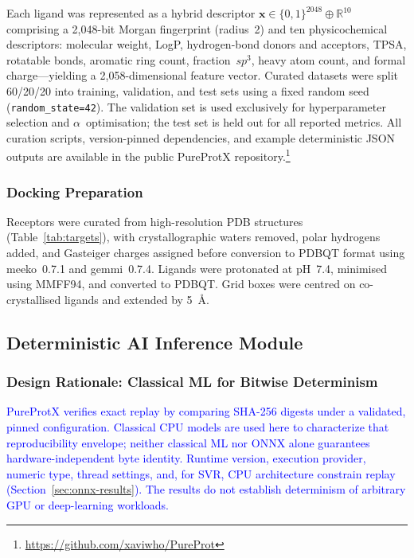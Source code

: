 \documentclass[conference]{IEEEtran}
\newcommand{\rev}[2]{\textcolor{blue}{#2}}
\begin{document}
Each ligand was represented as a hybrid descriptor
$\mathbf{x} \in \{0,1\}^{2048} \oplus \mathbb{R}^{10}$
comprising a 2{,}048-bit Morgan fingerprint (radius~2) and
ten physicochemical descriptors: molecular weight, LogP,
hydrogen-bond donors and acceptors, TPSA, rotatable bonds,
aromatic ring count, fraction~$sp^3$, heavy atom count, and
formal charge---yielding a 2{,}058-dimensional feature vector.
Curated datasets were split 60/20/20 into training, validation,
and test sets using a fixed random seed (\texttt{random\_state=42}).
The validation set is used exclusively for hyperparameter
selection and $\alpha$~optimisation; the test set is held out
for all reported metrics.
All curation scripts, version-pinned dependencies, and example
deterministic JSON outputs are available in the public
PureProtX repository.\footnote{\url{https://github.com/xaviwho/PureProt}}

\subsubsection{Docking Preparation}
Receptors were curated from high-resolution PDB structures
(Table~\ref{tab:targets}), with crystallographic waters removed,
polar hydrogens added, and Gasteiger charges assigned before
conversion to PDBQT format using meeko~0.7.1 and gemmi~0.7.4.
Ligands were protonated at pH~7.4, minimised using MMFF94, and
converted to PDBQT.
Grid boxes were centred on co-crystallised ligands and extended
by 5~\AA.

\subsection{\textbf{Deterministic AI Inference Module}}
\label{sec:ai}

\subsubsection{Design Rationale: Classical ML for Bitwise Determinism}

\rev{R1.1}{PureProtX verifies exact replay by comparing SHA-256
digests under a validated, pinned configuration. Classical CPU
models are used here to characterize that reproducibility envelope;
neither classical ML nor ONNX alone guarantees hardware-independent
byte identity. Runtime version, execution provider, numeric type,
thread settings, and, for SVR, CPU architecture constrain replay
(Section~\ref{sec:onnx-results}). The results do not establish
determinism of arbitrary GPU or deep-learning workloads.}
\end{document}
